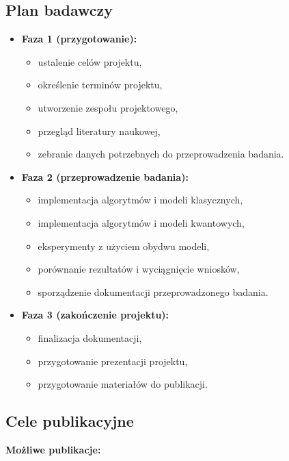 \documentclass[polish,envcountsect,10pt]{article}
\begin{document}
\subsection{Plan badawczy}

\begin{itemize}
    \item \textbf{Faza 1 (przygotowanie):}
    \begin{itemize}
        \item ustalenie celów projektu,
        \item określenie terminów projektu,
        \item utworzenie zespołu projektowego,
        \item przegląd literatury naukowej,
		\item zebranie danych potrzebnych do przeprowadzenia badania.
    \end{itemize}
    
    \item \textbf{Faza 2 (przeprowadzenie badania):}
    \begin{itemize}
        \item implementacja algorytmów i modeli klasycznych,
        \item implementacja algorytmów i modeli kwantowych,
        \item eksperymenty z użyciem obydwu modeli,
		\item porównanie rezultatów i wyciągnięcie wniosków,
        \item sporządzenie dokumentacji przeprowadzonego badania.
    \end{itemize}
    
    \item \textbf{Faza 3 (zakończenie projektu):}
    \begin{itemize}
        \item finalizacja dokumentacji,
        \item przygotowanie prezentacji projektu,
        \item przygotowanie materiałów do publikacji.
    \end{itemize}
\end{itemize}

\subsection{Cele publikacyjne}

\textbf{Możliwe publikacje:}
\end{document}
